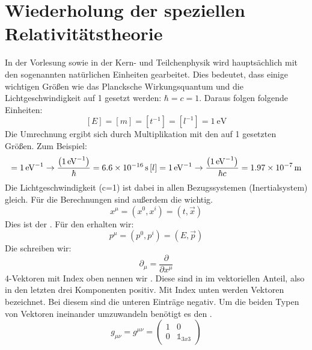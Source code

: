 \section{Wiederholung der speziellen Relativitätstheorie}

In der Vorlesung sowie in der Kern- und Teilchenphysik wird hauptsächlich mit 
den sogenannten natürlichen Einheiten gearbeitet. Dies bedeutet, dass 
einige wichtigen Größen wie das Plancksche Wirkungsquantum und die 
Lichtgeschwindigkeit auf 1 gesetzt werden: $ \hbar = c = 1 $.
Daraus folgen folgende Einheiten:
%
\begin{equation*}
	\left[ E \right] = \left[ m \right] = \left[ t^{-1} \right] = \left[ 
	l^{-1} \right] = \SI{1}{\eV}
\end{equation*}
% 
Die Umrechnung ergibt sich durch Multiplikation mit den auf 1 gesetzten
Größen. Zum Beispiel:
%
\begin{equation*}
	[ t ] = \SI{1}{\per \eV} \rightarrow \frac{\left( \SI{1}{\per \eV} 
	\right)}{\hbar} = \SI{6,6e-16}{\s} \\ 
	\left[ l \right] = \SI{1}{\per \eV} \rightarrow \frac{\left( \SI{1}{\per 
	\eV} 
	 \right)}{\hbar c} = \SI{1,97e-7}{\m}
\end{equation*}
%
Die Lichtgeschwindigkeit (c=1) ist dabei in allen Bezugssystemen
(Inertialsystem) gleich.
Für die Berechnungen sind außerdem die  wichtig. 
%
\begin{equation*}
	x^{\mu} = \left( x^0 , x^i \right) = \left( t, \vec{x} \right) 
\end{equation*}
%
Dies ist der .
Für den  erhalten wir:
%
\begin{equation*}
	p^{\mu} = \left( p^0 , p^i \right) = \left( E, \vec{p} \right) 
\end{equation*}
%
Die  schreiben wir:
%
\begin{equation*}
	\partial_{\mu} = \frac{\partial}{\partial{x^{\mu}}}
\end{equation*}
%
4-Vektoren mit Index oben nennen wir . Diese sind in
im vektoriellen Anteil, also in den letzten drei Komponenten positiv. Mit 
Index unten werden  Vektoren bezeichnet. Bei diesem
sind die unteren Einträge negativ. 
Um die beiden Typen von Vektoren ineinander umzuwandeln benötigt es den 
. 
%
\begin{equation*}
	g_{\mu \nu} = g^{\mu \nu} = 
	\begin{pmatrix} 
		1 & 0 \\
		0 & \mathbb{1}_{3x3}
	\end{pmatrix}
\end{equation*}
